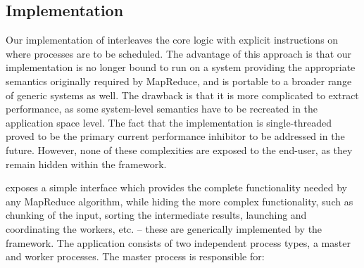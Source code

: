 \documentclass[3p,twocolumn]{elsarticle}
\begin{document}

\subsection{\sagamapreduce Implementation}

Our implementation of \sagamapreduce interleaves the core \mr logic
with explicit instructions on where processes are to be scheduled.
The advantage of this approach is that our implementation is no longer
bound to run on a system providing the appropriate semantics
originally required by MapReduce, and is portable to a broader range
of generic systems as well.  The drawback is that it is more
complicated to extract performance, as some system-level semantics have
to be recreated in the application space level.
The fact that the implementation is single-threaded proved to be the
primary current performance inhibitor to be addressed in the future.  However, none of these
complexities are exposed to the end-user, as they remain hidden within
the framework.



\smr exposes a simple interface which provides the complete
functionality needed by any MapReduce algorithm, while hiding the more
complex functionality, such as chunking of the input, sorting the
intermediate results, launching and coordinating the workers, etc. --
these are generically implemented by the framework.  The application
consists of two independent process types, a master and worker processes.
The master process is responsible for:
\end{document}
